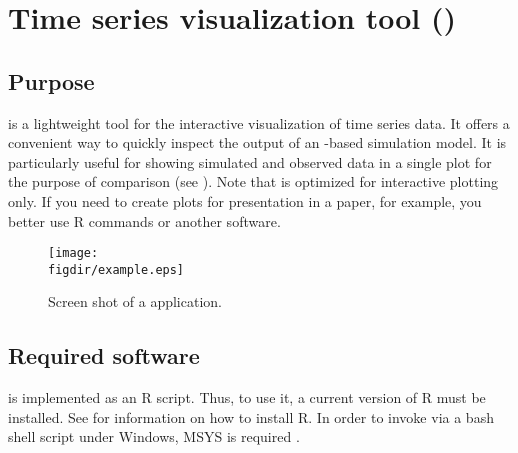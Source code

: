 
\newcommand{\tsplot}{\textsc{Tsplot}}

\chapter{Time series visualization tool ()} \label{chap:tsplot}
\renewcommand{\tabdir}{chapters/tsplot/tab}
\renewcommand{\figdir}{chapters/tsplot/fig}

\section{Purpose} \label{sec:tsplot:purpose}
 is a lightweight tool for the interactive visualization of time series data. It offers a convenient way to quickly inspect the output of an -based simulation model. It is particularly useful for showing simulated and observed data in a single plot for the purpose of comparison (see ).
Note that  is optimized for interactive plotting only. If you need to create plots for presentation in a paper, for example, you better use R commands or another software.

\begin{figure*}
  \texttt{[image: \\figdir/example.eps]}
  \caption{Screen shot of a  application. \label{fig:tsplot:example}}
\end{figure*}

\section{Required software} \label{sec:tsplot:software}
 is implemented as an R script. Thus, to use it, a current version of R must be installed. See \citet{Echse-Install-Doc} for information on how to install R. In order to invoke  via a bash shell script under Windows, MSYS is required \citep[see][]{Echse-Install-Doc}.

